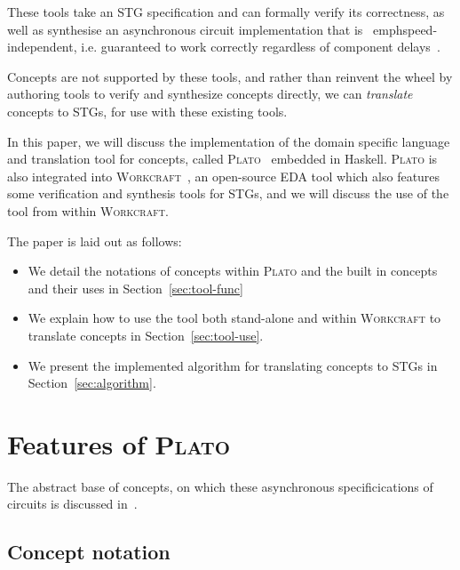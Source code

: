 \documentclass[british,conference,compsoc]{IEEEtran}
\newcommand{\noun}[1]{\textsc{#1}}
\begin{document}
These tools take an STG specification and can formally verify its correctness, 
as well as synthesise an asynchronous circuit implementation that is \
emph{speed-independent}, i.e. guaranteed to work correctly regardless of 
component delays~\cite{Muller_1959_ts}.

Concepts are not supported by these tools, and rather than reinvent the wheel by
authoring tools to verify and synthesize concepts directly, we can 
\emph{translate} concepts to STGs, for use with these existing tools.

In this paper, we will discuss the implementation of the domain specific 
language and translation tool for concepts, called 
\noun{Plato}~\cite{2016_concepts_github} embedded in Haskell. \noun{Plato} is 
also integrated into \noun{Workcraft}~\cite{Workcraft_website}, an open-source 
EDA tool which also features some verification and synthesis tools for STGs, 
and we will discuss the use of the tool from within \noun{Workcraft}.

The paper is laid out as follows:
\vspace{-6mm}
\begin{itemize}
  \item We detail the notations of concepts within \noun{Plato} and the built in
  concepts and their uses in Section~\ref{sec:tool-func}
  \item We explain how to use the tool both stand-alone and within
  \noun{Workcraft} to translate concepts in Section~\ref{sec:tool-use}.
  \item We present the implemented algorithm for translating concepts to STGs
  in Section~\ref{sec:algorithm}.
\end{itemize}

\section{Features of \noun{Plato}\label{sec:tool-func}}

\vspace{-3mm}

The abstract base of concepts, on which these asynchronous specificications of 
circuits is discussed in~\cite{2015_Beaumont_MEMOCODE}.

\vspace{-3mm}

\subsection{Concept notation \label{sub:concept-notation}}
\end{document}
